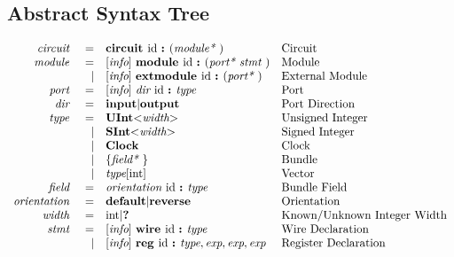 \documentclass[12pt]{article}
\begin{document}
\subsection{Abstract Syntax Tree}
{ \fontsize{10pt}{1.10em}\selectfont
\[
\begin{array}{rrll}
\text{\em circuit\ }    &=     &\text{\bf circuit\ } \text{id } \text{\bf :\ } (\text{\em module*\ })                                        &\text{Circuit}\\
\text{\em module\ }     &=     &[\text{\em info}]\  \text{\bf module\ }  \text{id } \text{\bf :\ } (\text{\em port*\ } \text{\em stmt\ })                          &\text{Module}\\
                &\vert &[\text{\em info}]\  \text{\bf extmodule\ }  \text{id } \text{\bf :\ } (\text{\em port*\ })                                 &\text{External Module}\\
\text{\em port\ }       &=     &[\text{\em info}]\  \text{\em dir\ } \text{id } \text{\bf :\ } \text{\em type\ }                                           &\text{Port}\\
\text{\em dir\ }        &=     &\text{\bf input} \vert \text{\bf output}                                                &\text{Port Direction}\\
\text{\em type\ }       &=     &\text{\bf UInt} \text{\bf $<$} \text{\em width} \text{\bf $>$}                                    &\text{Unsigned Integer}\\
                &\vert &\text{\bf SInt} \text{\bf $<$} \text{\em width} \text{\bf $>$}                                    &\text{Signed Integer}\\
                &\vert &\text{\bf Clock}                                                                   &\text{Clock}\\
                &\vert &\{\text{\em field*\ }\}                                                         &\text{Bundle}\\
                &\vert &\text{\em type}[\text{int}]                                                             &\text{Vector}\\
\text{\em field\ }      &=     &\text{\em orientation\ } \text{id } \text{\bf :\ } \text{\em type\ }                                         &\text{Bundle Field}\\
\text{\em orientation\ }&=     &\text{\bf default} \vert \text{\bf reverse}                                             &\text{Orientation}\\
\text{\em width\ }      &=     &\text{int} \vert \text{\bf ?\ }                                                            &\text{Known/Unknown Integer Width}\\
\text{\em stmt\ }       &=     &[\text{\em info}]\  \text{\bf wire\ } \text{id } \text{\bf :\ } \text{\em type\ }                                          &\text{Wire Declaration}\\
                &\vert &[\text{\em info}]\  \text{\bf reg\ } \text{id } \text{\bf :\ }  \text{\em type} , \text{\em exp} , \text{\em exp} , \text{\em exp}     &\text{Register Declaration}\\

\end{array}\]}
\end{document}
